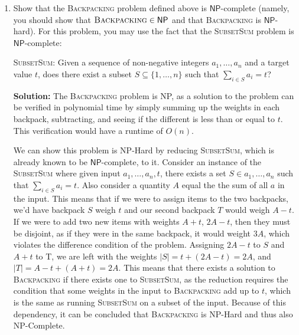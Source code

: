 \documentclass[10pt]{article}
\newcommand{\solution}[1]{\color{blue}\hfill\break\noindent\textbf{Solution:} #1\color{black}}
\begin{document}
\begin{enumerate}
  \item Show that the \textsc{Backpacking} problem defined above is $\mathsf{NP}$-complete (namely, you should
  show that $\textsc{Backpacking} \in \mathsf{NP}$ and that \textsc{Backpacking} is $\mathsf{NP}$-hard). For this
  problem, you may use the fact that the \textsc{SubsetSum} problem is $\mathsf{NP}$-complete:

  \begin{minipage}[t]{\linewidth}
  \begin{framed}
    \textsc{SubsetSum}: Given a sequence of non-negative integers $a_1, \ldots, a_n$
    and a target value $t$, does there exist
    a subset $S \subseteq \{ 1, \ldots, n \}$ such that $\sum_{i \in S} a_i = t$?
  \end{framed}
  \end{minipage}
  
  \solution{
  The \textsc{Backpacking} problem is NP, as a solution to the problem can be verified in polynomial time by simply summing up the weights in each backpack, subtracting, and seeing if the different is less than or equal to $t$. This verification would have a runtime of $O(n)$. 
  
  We can show this problem is NP-Hard by reducing \textsc{SubsetSum}, which is already known to be $\mathsf{NP}$-complete, to it.
  Consider an instance of the \textsc{SubsetSum} where given input $a_1, \ldots, a_n , t$, there exists a set $S \in {a_1, \ldots, a_n}$ such that $\sum_{i \in S} a_i = t$. Also consider a quantity $A$ equal the the sum of all $a$ in the input. This means that if we were to assign items to the two backpacks, we'd have backpack $S$ weigh $t$ and our second backpack $T$ would weigh $A - t.$ If we were to add two new items with weights $A + t$, $2A - t$, then they must be disjoint, as if they were in the same backpack, it would weight $3A$, which violates the difference condition of the problem. Assigning $2A - t$ to $S$ and $A + t$ to T, we are left with the weights $\lvert S \rvert = t + (2A - t) = 2A$, and $\lvert T \rvert = A - t + (A + t) = 2A$. This means that there exists a solution to \textsc{Backpacking} if there exists one to \textsc{SubsetSum}, as the reduction requires the condition that some weights in the input to \textsc{Backpacking} add up to $t$, which is the same as running \textsc{SubsetSum} on a subset of the input. Because of this dependency, it can be concluded that \textsc{Backpacking} is NP-Hard and thus also NP-Complete.
  }


\end{enumerate}
\end{document}
